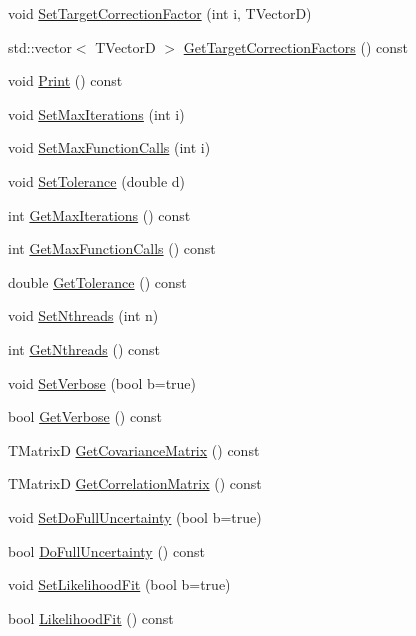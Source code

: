 \begin{DoxyCompactItemize}
void \hyperlink{classCoulExSimFitter_af4764a0abfbec937d6aaf51459d741a8}{Set\-Target\-Correction\-Factor} (int i, T\-Vector\-D)
\item 
std\-::vector$<$ T\-Vector\-D $>$ \hyperlink{classCoulExSimFitter_ae528d5210550e3a751a053204d24d7a8}{Get\-Target\-Correction\-Factors} () const 
\item 
void \hyperlink{classCoulExSimFitter_ad2b70cca6d786a23f35231cf931ef65f}{Print} () const 
\item 
void \hyperlink{classCoulExSimFitter_ae8bcedc89a1730f6295cdf862643aa35}{Set\-Max\-Iterations} (int i)
\item 
void \hyperlink{classCoulExSimFitter_a5d482897c57846bf1b83c645843c016f}{Set\-Max\-Function\-Calls} (int i)
\item 
void \hyperlink{classCoulExSimFitter_af2da6ea0d1104d2516d453ee18a234f2}{Set\-Tolerance} (double d)
\item 
int \hyperlink{classCoulExSimFitter_acdbafed7b7924be5e1e4db1f423ec3b9}{Get\-Max\-Iterations} () const 
\item 
int \hyperlink{classCoulExSimFitter_a2b02493b398ecb403eba6d2e7749afbd}{Get\-Max\-Function\-Calls} () const 
\item 
double \hyperlink{classCoulExSimFitter_a798bbe43d1e820d600b3fa2530e7be0b}{Get\-Tolerance} () const 
\item 
void \hyperlink{classCoulExSimFitter_a900dcc1fe094d4d4890d52c48f6240ca}{Set\-Nthreads} (int n)
\item 
int \hyperlink{classCoulExSimFitter_a2b33f0db4913d47610c616e0609709a4}{Get\-Nthreads} () const 
\item 
void \hyperlink{classCoulExSimFitter_a3ed1f75a477a2386c801c9b003c11aed}{Set\-Verbose} (bool b=true)
\item 
bool \hyperlink{classCoulExSimFitter_abbcbf6dd58cc2bb7e069ca28335e0519}{Get\-Verbose} () const 
\item 
T\-Matrix\-D \hyperlink{classCoulExSimFitter_ad91f2c1cc9a8f70bcbb0230332512f74}{Get\-Covariance\-Matrix} () const 
\item 
T\-Matrix\-D \hyperlink{classCoulExSimFitter_a03d49714b01305301f4cdbcd768c75ea}{Get\-Correlation\-Matrix} () const 
\item 
void \hyperlink{classCoulExSimFitter_a74d529e145d3fdd3e2e6ae678f89710e}{Set\-Do\-Full\-Uncertainty} (bool b=true)
\item 
bool \hyperlink{classCoulExSimFitter_a4f9ea9189d5f8d21c765b9fe9f0a0508}{Do\-Full\-Uncertainty} () const 
\item 
void \hyperlink{classCoulExSimFitter_a9f895c0ad7d5219651c868d5ba7c48a9}{Set\-Likelihood\-Fit} (bool b=true)
\item 
bool \hyperlink{classCoulExSimFitter_ac7a39a2a950095941b4c526a73b2f1ad}{Likelihood\-Fit} () const 
\end{DoxyCompactItemize}


